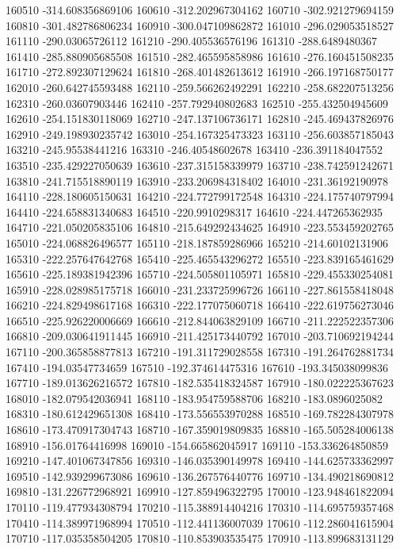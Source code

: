 {160510 -314.608356869106
160610 -312.202967304162
160710 -302.921279694159
160810 -301.482786806234
160910 -300.047109862872
161010 -296.029053518527
161110 -290.03065726112
161210 -290.405536576196
161310 -288.6489480367
161410 -285.880905685508
161510 -282.465595858986
161610 -276.160451508235
161710 -272.892307129624
161810 -268.401482613612
161910 -266.197168750177
162010 -260.642745593488
162110 -259.566262492291
162210 -258.682207513256
162310 -260.03607903446
162410 -257.792940802683
162510 -255.432504945609
162610 -254.151830118069
162710 -247.137106736171
162810 -245.469437826976
162910 -249.198930235742
163010 -254.167325473323
163110 -256.603857185043
163210 -245.95538441216
163310 -246.40548602678
163410 -236.391184047552
163510 -235.429227050639
163610 -237.315158339979
163710 -238.742591242671
163810 -241.715518890119
163910 -233.206984318402
164010 -231.36192190978
164110 -228.180605150631
164210 -224.772799172548
164310 -224.175740797994
164410 -224.658831340683
164510 -220.9910298317
164610 -224.447265362935
164710 -221.050205835106
164810 -215.649292434625
164910 -223.553459202765
165010 -224.068826496577
165110 -218.187859286966
165210 -214.60102131906
165310 -222.257647642768
165410 -225.465543296272
165510 -223.839165461629
165610 -225.189381942396
165710 -224.505801105971
165810 -229.455330254081
165910 -228.028985175718
166010 -231.233725996726
166110 -227.861558418048
166210 -224.829498617168
166310 -222.177075060718
166410 -222.619756273046
166510 -225.926220006669
166610 -212.844063829109
166710 -211.222522357306
166810 -209.030641911445
166910 -211.425173440792
167010 -203.710692194244
167110 -200.365858877813
167210 -191.311729028558
167310 -191.264762881734
167410 -194.03547734659
167510 -192.374614475316
167610 -193.345038099836
167710 -189.013626216572
167810 -182.535418324587
167910 -180.022225367623
168010 -182.079542036941
168110 -183.954759588706
168210 -183.0896025082
168310 -180.612429651308
168410 -173.556553970288
168510 -169.782284307978
168610 -173.470917304743
168710 -167.359019809835
168810 -165.505284006138
168910 -156.01764416998
169010 -154.665862045917
169110 -153.336264850859
169210 -147.401067347856
169310 -146.035390149978
169410 -144.625733362997
169510 -142.939299673086
169610 -136.267576440776
169710 -134.490218690812
169810 -131.226772968921
169910 -127.859496322795
170010 -123.948461822094
170110 -119.477934308794
170210 -115.388914404216
170310 -114.695759357468
170410 -114.389971968994
170510 -112.441136007039
170610 -112.286041615904
170710 -117.035358504205
170810 -110.853903535475
170910 -113.899683131129
}
